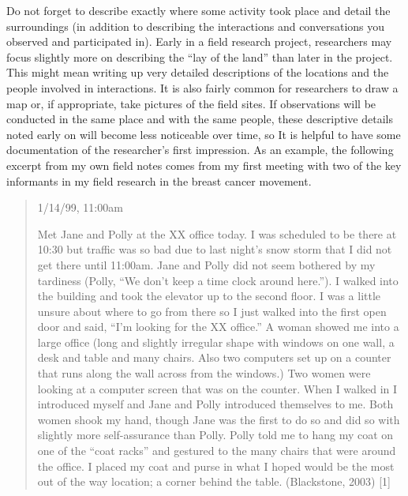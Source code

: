 Do not forget to describe exactly where some activity took place and detail the surroundings (in addition to describing the interactions and conversations you observed and participated in). Early in a field research project, researchers may focus slightly more on describing the ``lay of the land'' than later in the project. This might mean writing up very detailed descriptions of the locations and the people involved in interactions. It is also fairly common for researchers to draw a map or, if appropriate, take pictures of the field sites. If observations will be conducted in the same place and with the same people, these descriptive details noted early on will become less noticeable over time, so It is helpful to have some documentation of the researcher's first impression. As an example, the following excerpt from my own field notes comes from my first meeting with two of the key informants in my field research in the breast cancer movement.

\begin{quote}
	
1/14/99, 11:00am

Met Jane and Polly at the XX office today. I was scheduled to be there at 10:30 but traffic was so bad due to last night’s snow storm that I did not get there until 11:00am. Jane and Polly did not seem bothered by my tardiness (Polly, ``We don’t keep a time clock around here.''). I walked into the building and took the elevator up to the second floor. I was a little unsure about where to go from there so I just walked into the first open door and said, ``I’m looking for the XX office.'' A woman showed me into a large office (long and slightly irregular shape with windows on one wall, a desk and table and many chairs. Also two computers set up on a counter that runs along the wall across from the windows.) Two women were looking at a computer screen that was on the counter. When I walked in I introduced myself and Jane and Polly introduced themselves to me. Both women shook my hand, though Jane was the first to do so and did so with slightly more self-assurance than Polly. Polly told me to hang my coat on one of the ``coat racks'' and gestured to the many chairs that were around the office. I placed my coat and purse in what I hoped would be the most out of the way location; a corner behind the table. (Blackstone, 2003) [1]

\end{quote}

